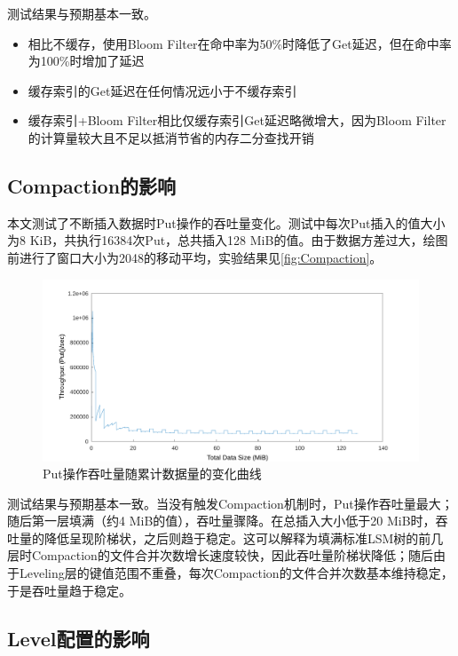\documentclass[a4paper,UTF8]{ctexart}
\begin{document}
\par
测试结果与预期基本一致。
\begin{itemize}
	\item 相比不缓存，使用Bloom Filter在命中率为50\%时降低了Get延迟，但在命中率为100\%时增加了延迟
	\item 缓存索引的Get延迟在任何情况远小于不缓存索引
	\item 缓存索引+Bloom Filter相比仅缓存索引Get延迟略微增大，因为Bloom Filter的计算量较大且不足以抵消节省的内存二分查找开销
\end{itemize}

\subsection{Compaction的影响}

本文测试了不断插入数据时Put操作的吞吐量变化。测试中每次Put插入的值大小为8 KiB，共执行16384次Put，总共插入128 MiB的值。由于数据方差过大，绘图前进行了窗口大小为2048的移动平均，实验结果见\autoref{fig:Compaction}。
\begin{figure}[htbp]
	\centering
	\includegraphics[width=.8\textwidth]{compaction.pdf}
	\caption{Put操作吞吐量随累计数据量的变化曲线}
	\label{fig:Compaction}
\end{figure}

\par
测试结果与预期基本一致。当没有触发Compaction机制时，Put操作吞吐量最大；随后第一层填满（约4 MiB的值），吞吐量骤降。在总插入大小低于20 MiB时，吞吐量的降低呈现阶梯状，之后则趋于稳定。这可以解释为填满标准LSM树的前几层时Compaction的文件合并次数增长速度较快，因此吞吐量阶梯状降低；随后由于Leveling层的键值范围不重叠，每次Compaction的文件合并次数基本维持稳定，于是吞吐量趋于稳定。


\subsection{Level配置的影响}
\end{document}
